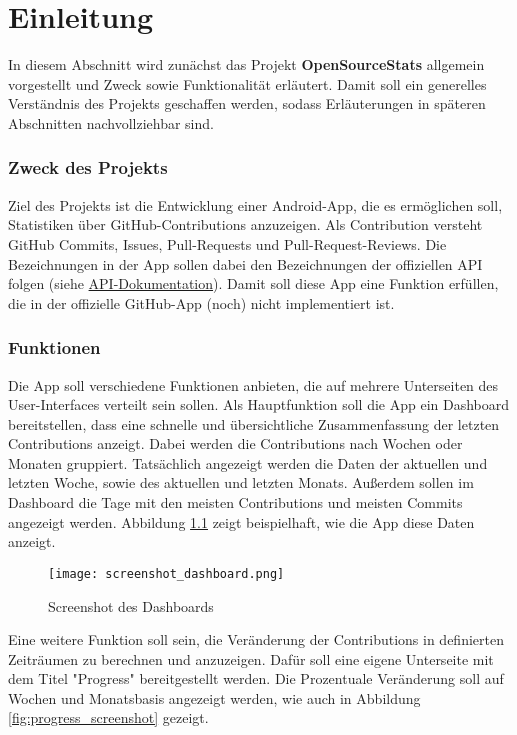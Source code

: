 \chapter{Einleitung}
\label{ch:Intro}

In diesem Abschnitt wird zunächst das Projekt \textbf{OpenSourceStats} allgemein vorgestellt und Zweck sowie Funktionalität erläutert.
Damit soll ein generelles Verständnis des Projekts geschaffen werden, sodass Erläuterungen in späteren Abschnitten nachvollziehbar sind.
\subsection*{Zweck des Projekts}
Ziel des Projekts ist die Entwicklung einer Android-App, die es ermöglichen soll, Statistiken über GitHub-Contributions anzuzeigen.
Als Contribution versteht GitHub Commits, Issues, Pull-Requests und Pull-Request-Reviews.
Die Bezeichnungen in der App sollen dabei den Bezeichnungen der offiziellen API folgen (siehe \href{https://docs.github.com/en/graphql/reference/objects#contributionscollection}{API-Dokumentation}).
Damit soll diese App eine Funktion erfüllen, die in der offizielle GitHub-App (noch) nicht implementiert ist.
\subsection*{Funktionen}
Die App soll verschiedene Funktionen anbieten, die auf mehrere Unterseiten des User-Interfaces verteilt sein sollen.
Als Hauptfunktion soll die App ein Dashboard bereitstellen, dass eine schnelle und übersichtliche Zusammenfassung der letzten Contributions anzeigt.
Dabei werden die Contributions nach Wochen oder Monaten gruppiert.
Tatsächlich angezeigt werden die Daten der aktuellen und letzten Woche, sowie des aktuellen und letzten Monats.
Außerdem sollen im Dashboard die Tage mit den meisten Contributions und meisten Commits angezeigt werden.
Abbildung \ref{fig:dashboard_screenshot} zeigt beispielhaft, wie die App diese Daten anzeigt.

\begin{figure}
    \texttt{[image: screenshot\_dashboard.png]}
    \centering
    \caption{Screenshot des Dashboards}
    \label{fig:dashboard_screenshot}
\end{figure}
Eine weitere Funktion soll sein, die Veränderung der Contributions in definierten Zeiträumen zu berechnen und anzuzeigen.
Dafür soll eine eigene Unterseite mit dem Titel "Progress" bereitgestellt werden.
Die Prozentuale Veränderung soll auf Wochen und Monatsbasis angezeigt werden, wie auch in Abbildung \ref{fig:progress_screenshot} gezeigt.

